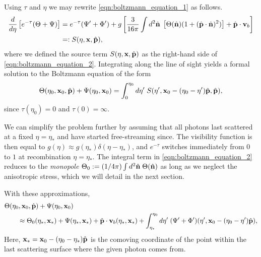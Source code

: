 Using $\tau$ and $\eta$ we may rewrite \eqref{eqn:boltzmann_equation_1} as follows.
\begin{align}
	\frac{d}{d\eta} \left[ e^{-\tau} (\Theta + \Psi) \right] &= e^{-\tau}(\Psi' + \Phi') + g \left[ \frac{3}{16\pi} \int d^2\hat{\mathbf{n}} \; \left[ \Theta(\hat{\mathbf{n}}) (1 + (\hat{\mathbf{p}} \cdot \hat{\mathbf{n}})^2) \right] + \hat{\mathbf{p}} \cdot \mathbf{v}_b \right] \label{eqn:boltzmann_equation_2} \\
	&=: S(\eta, \mathbf{x}, \hat{\mathbf{p}}), \label{def:boltzmann_source_term}
\end{align}
where we defined the source term $S(\eta,\mathbf{x},\hat{\mathbf{p}})$ as the right-hand side of \eqref{eqn:boltzmann_equation_2}. Integrating along the line of sight yields a formal solution to the Boltzmann equation of the form
\begin{align}
	\Theta(\eta_0, \mathbf{x}_0, \hat{\mathbf{p}}) + \Psi(\eta_0, \mathbf{x}_0) = \int_0^{\eta_0} d\eta' \; S(\eta', \mathbf{x}_0 - (\eta_0 -\eta') \hat{\mathbf{p}}, \hat{\mathbf{p}}), 
\end{align}
since $\tau(\eta_0)=0$ and $\tau(0) = \infty$.

We can simplify the problem further by assuming that all photons last scattered at a fixed $\eta=\eta_*$ and have started free-streaming since. The visibility function is then equal to $g(\eta)\approx g(\eta_*)\delta(\eta-\eta_*)$, and $e^{-\tau}$ switches immediately from $0$ to $1$ at recombination $\eta=\eta_*$. The integral term in \eqref{eqn:boltzmann_equation_2} reduces to the \textit{monopole} $\Theta_0 := (1/4\pi)\int d^2\hat{\mathbf{n}} \;\Theta(\hat{\mathbf{n}})$ as long as we neglect the anisotropic stress, which we will detail in the next section. 

With these approximations,
\begin{align}
	&\Theta(\eta_0, \mathbf{x}_0, \hat{\mathbf{p}}) + \Psi(\eta_0, \mathbf{x}_0) \nonumber \\
	&\qquad \approx \Theta_0(\eta_*, \mathbf{x}_*) + \Psi(\eta_*, \mathbf{x}_*) + \hat{\mathbf{p}}\cdot \mathbf{v}_b (\eta_*, \mathbf{x}_*) + \int_{\eta_*}^{\eta_0} d\eta' \; (\Psi' + \Phi')(\eta', \mathbf{x}_0-(\eta_0-\eta')\hat{\mathbf{p}}), \label{eqn:line_of_sight_solution_approximated}
\end{align}
Here, $\mathbf{x}_* = \mathbf{x}_0-(\eta_0-\eta_*)\hat{\mathbf{p}}$ is the comoving coordinate of the point within the last scattering surface where the given photon comes from.

